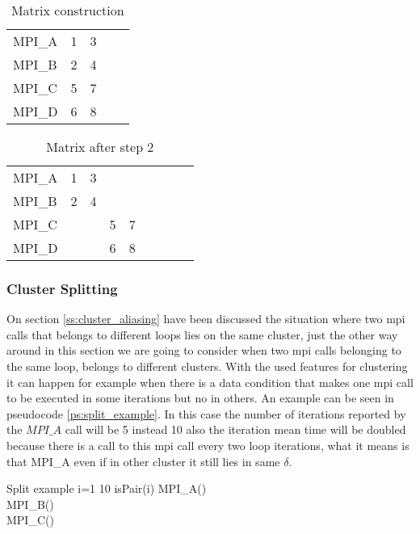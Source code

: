 \begin{table}[]
\centering
\caption{Matrix construction}
\label{tb:matrix_1}
\begin{tabular}{lllll}
MPI\_A & 1 & 3  \\
MPI\_B & 2 & 4  \\
MPI\_C & 5 & 7  \\
MPI\_D & 6 & 8 
\end{tabular}
\end{table}

\begin{table}[]
\centering
\caption{Matrix after step 2}
\label{tb:matrix_2}
\begin{tabular}{lllllllll}
MPI\_A & 1 & 3 &   &    \\
MPI\_B & 2 & 4 &   &    \\
MPI\_C &   &   & 5 & 7  \\
MPI\_D &   &   & 6 & 8 
\end{tabular}
\end{table}

\subsubsection{Cluster Splitting}\label{ss:cluster_split}

On section \ref{ss:cluster_aliasing} have been discussed the situation where two
mpi calls that belongs to different loops lies on the same cluster, just the
other way around in this section we are going to consider when two mpi calls
belonging to the same loop, belongs to different clusters. With the used
features for clustering it can happen for example when there is a data condition
that makes one mpi call to be executed in some iterations but no in others. An
example can be seen in pseudocode \ref{ps:split_example}. In this case the
number of iterations reported by the $MPI\_A$ call will be 5 instead 10 also the
iteration mean time will be doubled because there is a call to this mpi call
every two loop iterations, what it means is that MPI\_A even if in other
cluster it still lies in same $\delta$.

\begin{pseudocode}{Split example}{ }
    \label{ps:split_example}
    \FOR i=1  10 \DO
    \BEGIN
        \IF isPair(i) \THEN
            MPI\_A() \\
        MPI\_B() \\
        MPI\_C() \\
    \END \\
\end{pseudocode}

